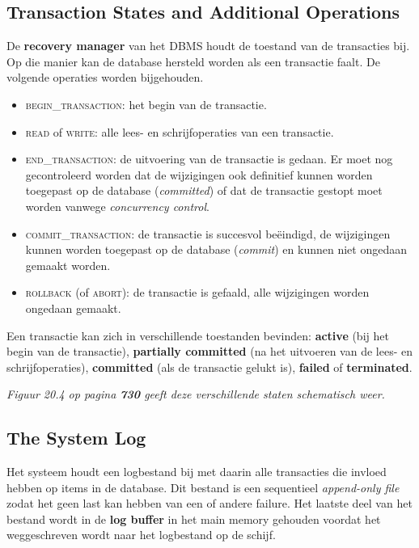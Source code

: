 \subsection{Transaction States and Additional Operations}
De \textbf{recovery manager} van het DBMS houdt de toestand van de transacties bij. Op die manier kan de database hersteld worden als een transactie faalt. De volgende operaties worden bijgehouden.
\begin{itemize}
\item \textsc{begin\_transaction}: het begin van de transactie.
\item \textsc{read} of \textsc{write}: alle lees- en schrijfoperaties van een transactie.
\item \textsc{end\_transaction}: de uitvoering van de transactie is gedaan. Er moet nog gecontroleerd worden dat de wijzigingen ook definitief kunnen worden toegepast op de database (\textit{committed}) of dat de transactie gestopt moet worden vanwege \textit{concurrency control}.
\item \textsc{commit\_transaction}: de transactie is succesvol be\"eindigd, de wijzigingen kunnen worden toegepast op de database (\textit{commit}) en kunnen niet ongedaan gemaakt worden.
\item \textsc{rollback} (of \textsc{abort}): de transactie is gefaald, alle wijzigingen worden ongedaan gemaakt.
\end{itemize}
Een transactie kan zich in verschillende toestanden bevinden: \textbf{active} (bij het begin van de transactie), \textbf{partially committed} (na het uitvoeren van de lees- en schrijfoperaties), \textbf{committed} (als de transactie gelukt is), \textbf{failed} of \textbf{terminated}.

\textit{Figuur 20.4 op pagina \textbf{730} geeft deze verschillende staten schematisch weer.}


\subsection{The System Log}
Het systeem houdt een logbestand bij met daarin alle transacties die invloed hebben op items in de database. Dit bestand is een sequentieel \textit{append-only file} zodat het geen last kan hebben van een of andere failure. Het laatste deel van het bestand wordt in de \textbf{log buffer} in het main memory gehouden voordat het weggeschreven wordt naar het logbestand op de schijf.

